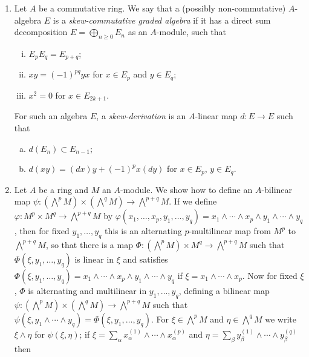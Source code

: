 \begin{enumerate}[(5)]
  \item Let $A$ be a commutative ring. We say that a (possibly non-commutative)
        $A$-algebra $E$ is a \emph{skew-commutative graded algebra} if it has a direct sum
        decomposition $E = \bigoplus_{n \ge 0} E_n$ as an $A$-module, such that
        \begin{enumerate}[(i)]
          \item $E_pE_q = E_{p+q}$;
          \item $xy = (-1)^{pq}yx$ for $x \in E_p$ and $y \in E_q$;
          \item $x^2 = 0$ for $x \in E_{2k+1}$.
        \end{enumerate}
        For such an algebra $E$, a \emph{skew-derivation} is an $A$-linear map $d\colon E \to E$
        such that
        \begin{enumerate}[(a)]
          \item $d(E_n) \subset E_{n-1}$;
          \item[($\beta$)] $d(xy) = (dx)y + (-1)^px(dy)$ for $x \in E_p$, $y \in E_q$.
        \end{enumerate}
  \item Let $A$ be a ring and $M$ an $A$-module. We show how to define an
        $A$-bilinear map $\psi\colon (\bigwedge^p M) \times (\bigwedge^q M) \to \bigwedge^{p+q} M$. If we
        define $\varphi\colon M^p \times M^q \to \bigwedge^{p+q} M$ by
        $\varphi(x_1, \ldots, x_p, y_1, \ldots, y_q) = x_1 \wedge \cdots \wedge x_p \wedge y_1 \wedge \cdots \wedge y_q$,
        then for fixed $y_1, \ldots, y_q$ this is an alternating $p$-multilinear map from
        $M^p$ to $\bigwedge^{p+q} M$, so that there is a map $\Phi\colon (\bigwedge^p M) \times M^q \to
        \bigwedge^{p+q} M$ such that $\Phi(\xi, y_1, \ldots, y_q)$ is linear in $\xi$ and satisfies
        $\Phi(\xi, y_1, \ldots, y_q) = x_1 \wedge \cdots \wedge x_p \wedge y_1 \wedge \cdots \wedge y_q$ if
        $\xi = x_1 \wedge \cdots \wedge x_p$. Now for fixed $\xi$, $\Phi$ is alternating and multilinear in
        $y_1, \ldots, y_q$, defining a bilinear map $\psi\colon (\bigwedge^p M) \times (\bigwedge^q M) \to
        \bigwedge^{p+q} M$ such that $\psi(\xi, y_1 \wedge \cdots \wedge y_q) = \Phi(\xi, y_1, \ldots, y_q)$. For
        $\xi \in \bigwedge^p M$ and $\eta \in \bigwedge^q M$ we write $\xi \wedge \eta$ for $\psi(\xi, \eta)$; if
        $\xi = \sum_\alpha x_\alpha^{(1)} \wedge \cdots \wedge x_\alpha^{(p)}$ and
        $\eta = \sum_\beta y_\beta^{(1)} \wedge \cdots \wedge y_\beta^{(q)}$ then

\end{enumerate}
